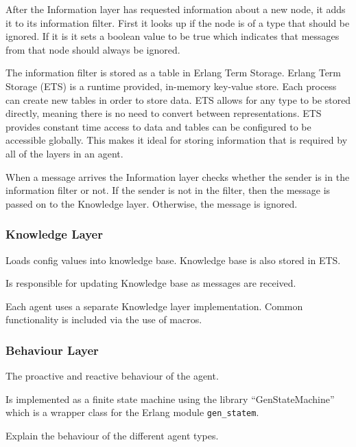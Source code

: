 After the Information layer has requested information about a new node, it adds it to its information filter.
First it looks up if the node is of a type that should be ignored.
If it is it sets a boolean value to be true which indicates that messages from that node should always be ignored.

The information filter is stored as a table in Erlang Term Storage.
Erlang Term Storage (ETS) is a runtime provided, in-memory key-value store.
Each process can create new tables in order to store data.
ETS allows for any type to be stored directly, meaning there is no need to convert between representations.
ETS provides constant time access to data and tables can be configured to be accessible globally.
This makes it ideal for storing information that is required by all of the layers in an agent.

When a message arrives the Information layer checks whether the sender is in the information filter or not.
If the sender is not in the filter, then the message is passed on to the Knowledge layer.
Otherwise, the message is ignored.

\subsubsection{Knowledge Layer}

Loads config values into knowledge base.
Knowledge base is also stored in ETS\@.

Is responsible for updating Knowledge base as messages are received.

Each agent uses a separate Knowledge layer implementation.
Common functionality is included via the use of macros.

\subsubsection{Behaviour Layer}

The proactive and reactive behaviour of the agent.

Is implemented as a finite state machine using the library ``GenStateMachine'' which is a wrapper class for the Erlang module \verb|gen_statem|.

Explain the behaviour of the different agent types.
